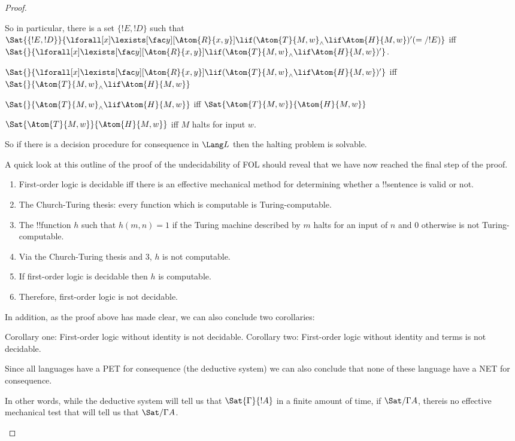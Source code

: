 \documentclass[../../../include/open-logic-section]{subfiles}
\begin{document}
\begin{proof}
\begin{enumerate}
So in particular, there is a set $\{ !E, !D \}$ such that $\Sat{\{!E, !D\}
}{\lforall[x]\lexists[\fac y][\Atom{R}{x,y}]\lif (\Atom{T}{M,w}_\land \lif
\Atom{H}{M,w})'(=/!E)}$
iff $\Sat{}{\lforall[x]\lexists[\fac y][\Atom{R}{x,y}]\lif (\Atom{T}{M,w}_\land
\lif \Atom{H}{M,w})'}$.

$\Sat{}{\lforall[x]\lexists[\fac y][\Atom{R}{x,y}]\lif (\Atom{T}{M,w}_\land
\lif\Atom{H}{M,w})'}$
iff $\Sat{}{\Atom{T}{M,w}_\land \lif \Atom{H}{M,w}}$

$\Sat{}{\Atom{T}{M,w}_\land \lif \Atom{H}{M,w}}$ iff
$\Sat{\Atom{T}{M,w}}{\Atom{H}{M,w}}$

$\Sat{\Atom{T}{M,w}}{\Atom{H}{M,w}}$ iff $M$ halts for input $w$.

So if there is a decision procedure for consequence in $\Lang L$ then the
halting problem is solvable.

A quick look at this outline of the proof of the undecidability of FOL
should reveal that we have now reached the final step of the proof.

\begin{enumerate}
\item First-order logic is decidable iff there is an effective mechanical
method for determining whether a !!{sentence} is valid or not.
\item The Church-Turing thesis: every function which is computable is
Turing-computable.
\item The !!{function} $h$ such that $h(m,n) = 1$ if the Turing machine
described by $m$ halts for an input of $n$ and $0$ otherwise is not
Turing-computable.
\item Via the Church-Turing thesis and 3, $h$ is not computable.
\item If first-order logic is decidable then $h$ is computable.
\item Therefore, first-order logic is not decidable.
\end{enumerate}

In addition, as the proof above has made clear, we can also conclude two
corollaries:

Corollary one: First-order logic without identity is not decidable.
Corollary two: First-order logic without identity and terms is not
decidable.

Since all languages have a PET for consequence (the deductive system) we
can also conclude that none of these language have a NET for consequence.

In other words, while the deductive system will tell us that
$\Sat{\Gamma}{!A}$ in a finite amount of time, if $\Sat/{\Gamma}{A}$,
thereis no effective mechanical test that will tell us that
$\Sat/{\Gamma}{A}$.
\end{enumerate}
\end{proof}
\end{document}

